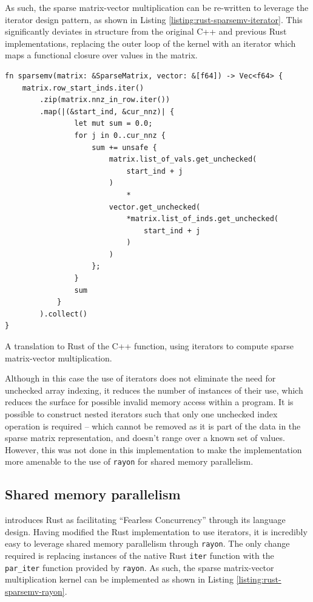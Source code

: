 As such, the sparse matrix-vector multiplication can be re-written to leverage the iterator design pattern, as shown in Listing \ref{listing:rust-sparsemv-iterator}. This significantly deviates in structure from the original C++ and previous Rust implementations, replacing the outer loop of the kernel with an iterator which maps a functional closure over values in the matrix.

\begin{code}
    \begin{verbatim}
fn sparsemv(matrix: &SparseMatrix, vector: &[f64]) -> Vec<f64> {
    matrix.row_start_inds.iter()
        .zip(matrix.nnz_in_row.iter())
        .map(|(&start_ind, &cur_nnz)| {
                let mut sum = 0.0;
                for j in 0..cur_nnz {
                    sum += unsafe {
                        matrix.list_of_vals.get_unchecked(
                            start_ind + j
                        )
                            *
                        vector.get_unchecked(
                            *matrix.list_of_inds.get_unchecked(
                                start_ind + j
                            )
                        )
                    };
                }
                sum
            }
        ).collect()
}
    \end{verbatim}
    \caption{A translation to Rust of the C++ function, using iterators to compute sparse matrix-vector multiplication.}
    \label{listing:rust-sparsemv-iterator}
\end{code}

Although in this case the use of iterators does not eliminate the need for unchecked array indexing, it reduces the number of instances of their use, which reduces the surface for possible invalid memory access within a program. It is possible to construct nested iterators such that only one unchecked index operation is required -- which cannot be removed as it is part of the data in the sparse matrix representation, and doesn't range over a known set of values. However, this was not done in this implementation to make the implementation more amenable to the use of \texttt{rayon} for shared memory parallelism.

\subsection{Shared memory parallelism}
\label{sec:translation-rayon}

 introduces Rust as facilitating ``Fearless Concurrency'' through its language design. Having modified the Rust implementation to use iterators, it is incredibly easy to leverage shared memory parallelism through \texttt{rayon}. The only change required is replacing instances of the native Rust \texttt{iter} function with the \texttt{par\_iter} function provided by \texttt{rayon}. As such, the sparse matrix-vector multiplication kernel can be implemented as shown in Listing \ref{listing:rust-sparsemv-rayon}.

